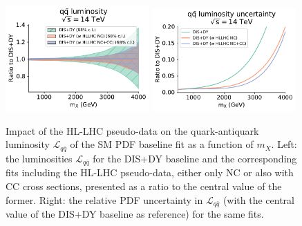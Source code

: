 \documentclass[withindex,glossary]{cam-thesis}
\begin{document}
\begin{figure}[t]
\begin{center}
  \includegraphics[width=0.49\textwidth]{dy_figures/DataHL_lumi_channels0_plot_lumi1d.pdf}
  \includegraphics[width=0.49\textwidth]{dy_figures/DataHL_lumi_channels0_UncRange_plot_lumi1d_uncertainties.pdf}
    \caption{\label{fig:hllhc-lumi-qqb} Impact of the
      HL-LHC pseudo-data on the quark-antiquark luminosity $\mathcal{L}_{q\bar{q}}$
      of the SM PDF baseline fit as a function
      of  $m_X$.
      Left: the luminosities $\mathcal{L}_{q\bar{q}}$ for the DIS+DY baseline
      and the corresponding fits including the HL-LHC pseudo-data, either only NC
      or also with CC cross sections, presented as a ratio to the central value of the former.
      Right: the relative PDF uncertainty in $\mathcal{L}_{q\bar{q}}$ (with the central
      value of the DIS+DY baseline as reference) for the same fits.
    }
\end{center}
\end{figure}
\end{document}
